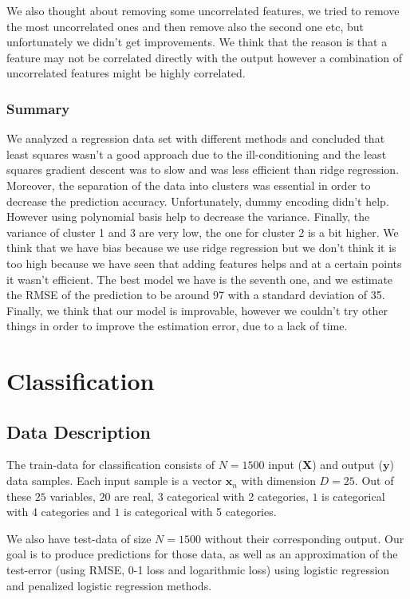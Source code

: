 \documentclass{article} %
\begin{document}
We also thought about removing some uncorrelated features, we tried to remove the most uncorrelated ones and then remove also the second one etc, but unfortunately we didn't get improvements. We think that the reason is that a feature may not be correlated directly with the output however a combination of uncorrelated features might be highly correlated. 

\subsubsection{Summary}

We analyzed a regression data set with different methods and concluded that least squares wasn't a good approach due to the ill-conditioning and the least squares gradient descent was to slow and was less efficient than ridge regression. Moreover, the separation of the data into clusters was essential in order to decrease the prediction accuracy. Unfortunately, dummy encoding didn't help. However using polynomial basis help to decrease the variance. Finally, the variance of cluster 1 and 3 are very low, the one for cluster 2 is a bit higher. We think that we have bias because we use ridge regression but we don't think it is too high because we have seen that adding features helps and at a certain points it wasn't efficient. The best model we have is the seventh one, and we estimate the RMSE of the prediction to be around 97 with a standard deviation of 35. Finally, we think that our model is improvable, however we couldn't try other things in order to improve the estimation error, due to a lack of time.

\section{Classification}

\subsection{Data Description}

The train-data for classification consists of $N = 1500$ input ($\mathbf{X}$) and output ($\mathbf{y}$) data samples. Each input sample is a vector $\mathbf{x}_n$ with dimension $D = 25$. Out of these $25$ variables, $20$ are real, $3$ categorical with 2 categories, $1$ is categorical with 4 categories and $1$ is categorical with 5 categories.

We also have test-data of size $N=1500$ without their corresponding output. Our goal is to produce predictions for those data, as well as an approximation of the test-error (using RMSE, 0-1 loss and logarithmic loss) using logistic regression and penalized logistic regression methods.
\end{document}
